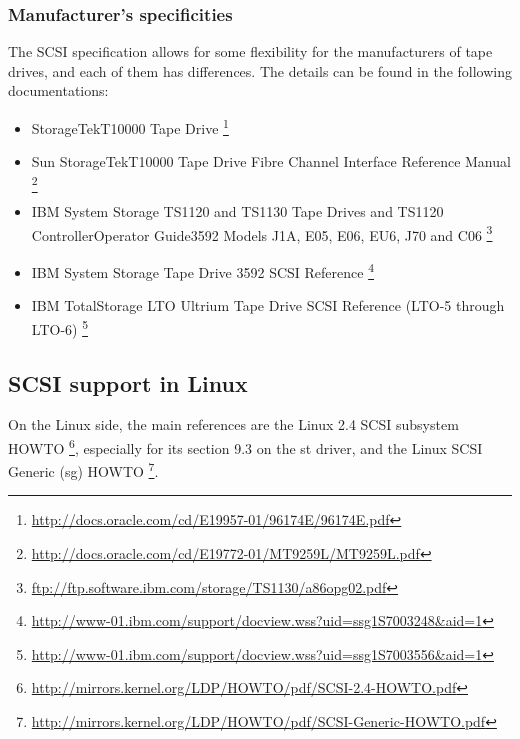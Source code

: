 \subsubsection{Manufacturer's specificities}
\label{Manufacturer's specificities}
The SCSI specification allows for some flexibility for the manufacturers of tape drives, and 
each of them has differences. The details can be found in the following documentations:

\begin{itemize}
\item{}StorageTek\texttrademark T10000 Tape Drive
       \footnote{ \href{http://docs.oracle.com/cd/E19957-01/96174E/96174E.pdf}
                       {http://docs.oracle.com/cd/E19957-01/96174E/96174E.pdf} }
\item{}Sun StorageTek\texttrademark T10000 Tape Drive Fibre Channel Interface Reference Manual
       \footnote{ \href{http://docs.oracle.com/cd/E19772-01/MT9259L/MT9259L.pdf}
                       {http://docs.oracle.com/cd/E19772-01/MT9259L/MT9259L.pdf} }
\item{}IBM System Storage TS1120 and TS1130 Tape Drives and TS1120 ControllerOperator Guide3592 Models J1A, E05, E06, EU6, J70 and C06
       \footnote{ \href{ftp://ftp.software.ibm.com/storage/TS1130/a86opg02.pdf}
                       {ftp://ftp.software.ibm.com/storage/TS1130/a86opg02.pdf} }
\item{}IBM System Storage Tape Drive 3592 SCSI Reference
       \footnote{ \href{http://www-01.ibm.com/support/docview.wss?uid=ssg1S7003248\&aid=1}
                       {http://www-01.ibm.com/support/docview.wss?uid=ssg1S7003248\&aid=1} }
\item{}IBM TotalStorage LTO Ultrium Tape Drive SCSI Reference  (LTO-5 through LTO-6)
       \footnote{ \href{http://www-01.ibm.com/support/docview.wss?uid=ssg1S7003556\&aid=1}
                       {http://www-01.ibm.com/support/docview.wss?uid=ssg1S7003556\&aid=1} }
\end{itemize}

\subsection{SCSI support in Linux}
On the Linux side, the main references are the Linux 2.4 SCSI subsystem HOWTO
       \footnote{ \href{http://mirrors.kernel.org/LDP/HOWTO/pdf/SCSI-2.4-HOWTO.pdf}
                       {http://mirrors.kernel.org/LDP/HOWTO/pdf/SCSI-2.4-HOWTO.pdf} },
especially for its section 9.3 on the st driver,
and the Linux SCSI Generic (sg) HOWTO 
       \footnote{ \href{http://mirrors.kernel.org/LDP/HOWTO/pdf/SCSI-Generic-HOWTO.pdf}
                       {http://mirrors.kernel.org/LDP/HOWTO/pdf/SCSI-Generic-HOWTO.pdf} }. 

